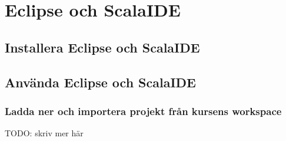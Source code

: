 \section{Eclipse och ScalaIDE}\label{appendix:ide:eclipse}

\subsection{Installera Eclipse och ScalaIDE}\label{appendix:ide:eclipse:install}

\subsection{Använda Eclipse och ScalaIDE}\label{appendix:ide:eclipse:use}

\subsubsection{Ladda ner och importera projekt från kursens workspace}

TODO: skriv mer här

